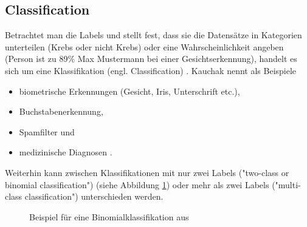 \subsection{Classification} \label{subsubsec:classification}
Betrachtet man die Labels und stellt fest, dass sie die Datensätze in Kategorien unterteilen (Krebs oder nicht Krebs) oder eine Wahrscheinlichkeit angeben (Person ist zu 89\% Max Mustermann bei einer Gesichtserkennung), handelt es sich um eine Klassifikation (engl. Classification) \citep[S.~67]{swamynathan_mastering_2017}. Kauchak nennt als Beispiele
\begin{itemize}
\item biometrische Erkennungen (Gesicht, Iris, Unterschrift etc.),
\item Buchstabenerkennung,
\item Spamfilter und
\item medizinische Diagnosen \citep[S.~5]{kauchak_neural_2016}.
\end{itemize}
Weiterhin kann zwischen Klassifikationen mit nur zwei Labels ("two-class or binomial classification"\citep{ericson_how_2017}) (siehe Abbildung \ref{fig:classification}) oder mehr als zwei Labels ("multi-class classification"\citep{ericson_how_2017}) unterschieden werden.
\begin{figure}[H]
\centering
{}
\caption{Beispiel für eine Binomialklassifikation aus \citep[S.~8]{suthaharan_machine_2016}}
\label{fig:classification}
\end{figure}

